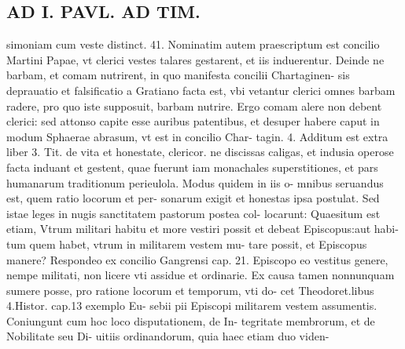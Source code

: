 \documentclass{article}
\begin{document}
\begin{pages}
\section*{AD I. PAVL. AD TIM. }
\marginpar{[ p.422 ]}\pstart simoniam cum veste distinct. 41.  \pend\pstart Nominatim autem praescriptum est concilio Martini Papae, vt clerici vestes talares gestarent, et iis induerentur. Deinde ne barbam, et comam nutrirent, in quo manifesta concilii Chartaginen- sis deprauatio et falsificatio a Gratiano facta est, vbi vetantur clerici omnes barbam radere, pro quo iste supposuit, barbam nutrire. Ergo comam alere non debent clerici: sed attonso capite esse auribus patentibus, et desuper habere caput in modum Sphaerae abrasum, vt est in concilio Char- tagin. 4. Additum est extra liber 3. Tit. de vita et honestate, clericor. ne discissas caligas, et indusia operose facta induant et gestent, quae fuerunt iam monachales superstitiones, et pars humanarum traditionum perieulola. Modus quidem in iis o- mnibus seruandus est, quem ratio locorum et per- sonarum exigit et honestas ipsa postulat. Sed istae leges in nugis sanctitatem pastorum postea col- locarunt:  \pend\pstart Quaesitum est etiam, Vtrum militari habitu et more vestiri possit et debeat Episcopus:aut habi- tum quem habet, vtrum in militarem vestem mu- tare possit, et Episcopus manere? Respondeo ex concilio Gangrensi cap. 21. Episcopo eo vestitus genere, nempe militati, non licere vti assidue et ordinarie. Ex causa tamen nonnunquam sumere posse, pro ratione locorum et temporum, vti do- cet Theodoret.libus  4.Histor. cap.13 exemplo Eu- sebii pii Episcopi militarem vestem assumentis. Coniungunt cum hoc loco disputationem, de In- tegritate membrorum, et de Nobilitate seu Di- uitiis ordinandorum, quia haec etiam duo viden-  \pend

\end{pages}
\end{document}
